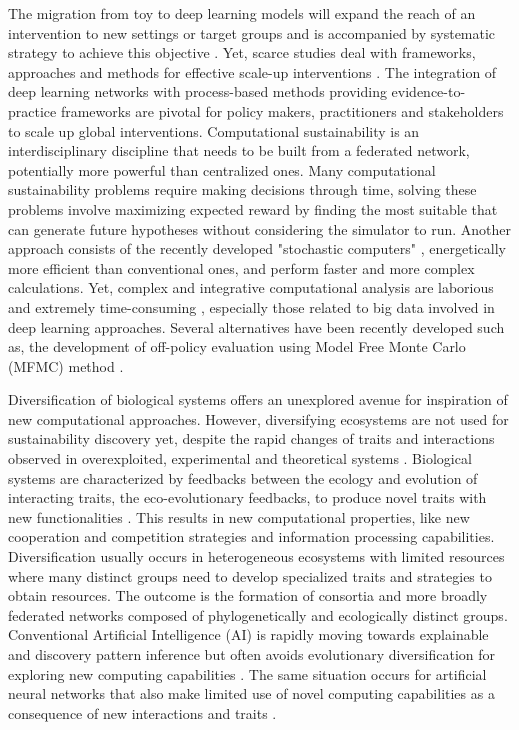 \documentclass[12pt,a4paper]{article}
\begin{document}
The migration from toy to deep learning models will expand the reach of an intervention to new settings or target groups and is accompanied by systematic strategy to achieve this objective \citep{milat2014increasing}. Yet, scarce studies deal with frameworks, approaches and methods for effective scale-up interventions \citep{wigboldus2013towards, yamey2012barriers}. The integration of deep learning networks with process-based methods providing evidence-to-practice frameworks are pivotal for policy makers, practitioners and stakeholders to scale up global interventions. Computational sustainability is an interdisciplinary discipline that needs to be built from a federated network, potentially more powerful than centralized ones. Many computational sustainability problems require making decisions through time, solving these problems involve maximizing expected reward by finding the most suitable that can generate future hypotheses without considering the simulator to run. Another approach consists of the recently developed "stochastic computers" \citep{borders2019integer}, energetically more efficient than conventional ones, and perform faster and more complex calculations. Yet, complex and integrative computational analysis are laborious and extremely time-consuming \citep{rodrigues2014integrative}, especially those related to big data involved in deep learning approaches. Several alternatives have been recently developed such as, the development of off-policy evaluation using Model Free Monte Carlo (MFMC) method \citep{fonteneau2010model}. 

Diversification of biological systems offers an unexplored avenue for inspiration of new computational approaches. However, diversifying ecosystems are not used for sustainability discovery yet, despite the rapid changes of traits and interactions observed in overexploited, experimental and theoretical systems \citep{Hairston2005, Walsh2006, Fussmann2007, Trugman8532}. Biological systems are characterized by feedbacks between the ecology and evolution of interacting traits, the eco-evolutionary feedbacks, to produce novel traits with new functionalities \citep{Govaertetal2019}. This results in new computational properties, like new cooperation and competition strategies and information processing capabilities. Diversification usually occurs in heterogeneous ecosystems with limited resources where many distinct groups need to develop specialized traits and strategies to obtain resources. The outcome is the formation of consortia and more broadly federated networks composed of phylogenetically and ecologically distinct groups. Conventional Artificial Intelligence (AI) is rapidly moving towards explainable and discovery pattern inference \citep{Iten2020a} but often avoids evolutionary diversification for exploring new computing capabilities \citep{Real2020}. The same situation occurs for artificial neural networks that also make limited use of novel computing capabilities as a consequence of new interactions and traits \citep{Schmidhuber:2015}.
\end{document}

